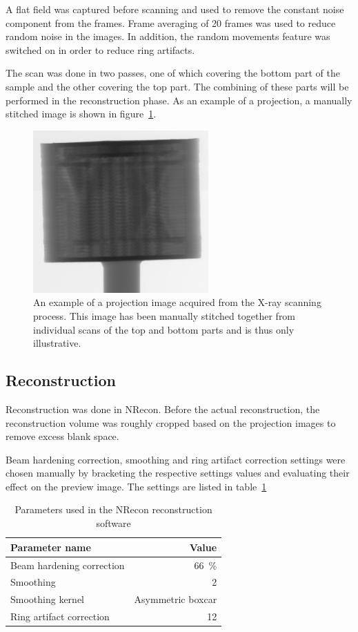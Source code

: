 \documentclass[a4paper,twoside,12pt]{article}
\begin{document}
A flat field was captured before scanning and used to remove the constant noise component from the frames. Frame averaging of 20 frames was used to reduce random noise in the images. In addition, the random movements feature was switched on in order to reduce ring artifacts.

The scan was done in two passes, one of which covering the bottom part of the sample and the other covering the top part. The combining of these parts will be performed in the reconstruction phase. As an example of a projection, a manually stitched image is shown in figure~\ref{fig:projection}.
\begin{figure}[h]
    \centering
    \includegraphics[width=0.6\textwidth]{images/projection.png}
    \caption{An example of a projection image acquired from the X-ray scanning process. This image has been manually stitched together from individual scans of the top and bottom parts and is thus only illustrative.}
    \label{fig:projection}
\end{figure}

\subsection{Reconstruction}
Reconstruction was done in NRecon. Before the actual reconstruction, the reconstruction volume was roughly cropped based on the projection images to remove excess blank space.

Beam hardening correction, smoothing and ring artifact correction settings were chosen manually by bracketing the respective settings values and evaluating their effect on the preview image. The settings are listed in table~\ref{table:nrecon_settings}
\begin{table}
    \centering
    \caption{Parameters used in the NRecon reconstruction software}
    \label{table:nrecon_settings}
    \begin{tabular}{lr}
        \toprule
        Parameter name & Value \\
        \midrule
        Beam hardening correction & \SI{66}{\percent} \\
        Smoothing & 2 \\
        Smoothing kernel & Asymmetric boxcar \\
        Ring artifact correction & 12 \\
        \bottomrule
    \end{tabular}
\end{table}
\end{document}
